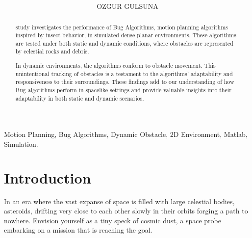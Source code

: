 \documentclass{IEEEtaes}
\begin{document}
\title{
        \\
       }


\author{OZGUR GULSUNA}



\editor{}
\supplementary{}




\maketitle

\begin{abstract} study investigates the performance of Bug Algorithms, motion planning algorithms inspired by insect behavior, in simulated dense planar environments. These algorithms are tested under both static and dynamic conditions, where obstacles are represented by celestial rocks and debris.

In dynamic environments, the algorithms conform to obstacle movement. This unintentional tracking of obstacles is a testament to the algorithms' adaptability and responsiveness to their surroundings. These findings add to our understanding of how Bug algorithms perform in spacelike settings and provide valuable insights into their adaptability in both static and dynamic scenarios.
\end{abstract}

\begin{IEEEkeywords}Motion Planning, Bug Algorithms, Dynamic Obstacle, 2D Environment, Matlab, Simulation.
\end{IEEEkeywords}
\vfill\null


\section{\large \textbf{Introduction}}

{\scshape I}n an era where the vast expanse of space is filled with large celestial bodies, asteroids, drifting very close to each other slowly in their orbits forging a path to nowhere. Envision yourself as a tiny speck of cosmic dust, a space probe embarking on a mission that is reaching the goal.
\end{document}
